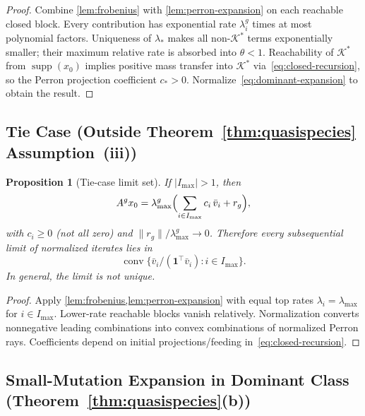 \documentclass[12pt]{article}
\newtheorem{proposition}[theorem]{Proposition}
\newcommand{\conv}{\operatorname{conv}}
\newcommand{\supp}{\operatorname{supp}}
\begin{document}
\begin{proof}
Combine \cref{lem:frobenius} with \cref{lem:perron-expansion} on each reachable closed block. Every contribution has exponential rate $\lambda_i^g$ times at most polynomial factors. Uniqueness of $\lambda_*$ makes all non-$\mathcal{K}^*$ terms exponentially smaller; their maximum relative rate is absorbed into $\theta < 1$. Reachability of $\mathcal{K}^*$ from $\supp(x_0)$ implies positive mass transfer into $\mathcal{K}^*$ via~\eqref{eq:closed-recursion}, so the Perron projection coefficient $c_* > 0$. Normalize~\eqref{eq:dominant-expansion} to obtain the result.
\end{proof}

\subsection{Tie Case (Outside Theorem~\ref*{thm:quasispecies} Assumption~(iii))}\label{app:tie}

\begin{proposition}[Tie-case limit set]\label{prop:tie}
If $|I_{\max}| > 1$, then
\begin{equation}
A^g x_0 = \lambda_{\max}^g \Bigl(\sum_{i \in I_{\max}} c_i\, \bar{v}_i + r_g\Bigr),
\end{equation}
with $c_i \ge 0$ (not all zero) and $\|r_g\|/\lambda_{\max}^g \to 0$. Therefore every subsequential limit of normalized iterates lies in
\begin{equation}
\conv\!\bigl\{\bar{v}_i / (\mathbf{1}^\top \bar{v}_i) : i \in I_{\max}\bigr\}.
\end{equation}
In general, the limit is not unique.
\end{proposition}

\begin{proof}
Apply \cref{lem:frobenius,lem:perron-expansion} with equal top rates $\lambda_i = \lambda_{\max}$ for $i \in I_{\max}$. Lower-rate reachable blocks vanish relatively. Normalization converts nonnegative leading combinations into convex combinations of normalized Perron rays. Coefficients depend on initial projections/feeding in~\eqref{eq:closed-recursion}.
\end{proof}

\subsection{Small-Mutation Expansion in Dominant Class (Theorem~\ref*{thm:quasispecies}(b))}\label{app:small-mutation}
\end{document}
